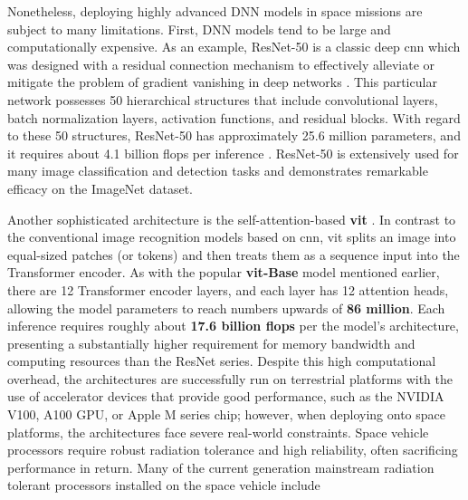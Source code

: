 Nonetheless, deploying highly advanced DNN models in space missions are subject to many limitations. First, DNN models tend to be large and computationally expensive. As an example, ResNet-50 is a classic deep \gls{cnn} which was designed with a residual connection mechanism to effectively alleviate or mitigate the problem of gradient vanishing in deep networks \cite{glorot2010understanding}. This particular network possesses 50 hierarchical structures that include convolutional layers, batch normalization layers, activation functions, and residual blocks. With regard to these 50 structures, ResNet-50 has approximately 25.6 million parameters, and it requires about 4.1 billion \gls{flops} per inference \cite{he2016deep}. ResNet-50 is extensively used for many image classification and detection tasks and demonstrates remarkable efficacy on the ImageNet dataset.



Another sophisticated architecture is the self-attention-based \textbf{\gls{vit}} \cite{dosovitskiy2020image}. In contrast to the conventional image recognition models based on \gls{cnn}, \gls{vit} splits an image into equal-sized patches (or tokens) and then treats them as a sequence input into the Transformer encoder. As with the popular \textbf{\gls{vit}-Base} model mentioned earlier, there are 12 Transformer encoder layers, and each layer has 12 attention heads, allowing the model parameters to reach numbers upwards of \textbf{86 million}. Each inference requires roughly about \textbf{17.6 billion \gls{flops}} per the model’s architecture, presenting a substantially higher requirement for memory bandwidth and computing resources than the ResNet series. Despite this high computational overhead, the architectures are successfully run on terrestrial platforms with the use of accelerator devices that provide good performance, such as the NVIDIA V100, A100 GPU, or Apple M series chip; however, when deploying onto space platforms, the architectures face severe real-world constraints. Space vehicle processors require robust radiation tolerance and high reliability, often sacrificing performance in return. Many of the current generation mainstream radiation tolerant processors installed on the space vehicle include



